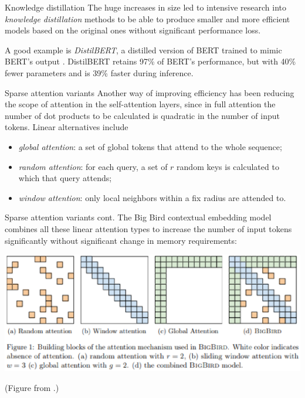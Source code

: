 \documentclass[style=upen, size=14pt]{powerdot}
\newcommand{\gold}{\color{arany}}
\theoremstyle{definition}
\begin{document}
\begin{slide}[toc=Distillation]{Knowledge distillation}
  The huge increases in size led to intensive research into \emph{knowledge
    distillation} methods to be able to produce smaller and more efficient
  models based on the original ones without significant performance
  loss.\bigskip

  A good example is \emph{\gold DistilBERT}, a distilled version of BERT trained
  to mimic BERT's output \citep{sanh2019distilbert}. DistilBERT retains 97\% of
  BERT's performance, but with 40\% fewer parameters and is 39\% faster during
  inference.
\end{slide}

\begin{slide}[toc=Sparse attention]{Sparse attention variants}
  Another way of improving efficiency has been reducing the scope of attention
  in the self-attention layers, since in full attention the number of dot
  products to be calculated is quadratic in the number of input tokens. Linear
  alternatives include
  \begin{itemize}
  \item \emph{\gold global attention}: a set of global tokens that attend to
    the whole sequence;
  \item \emph{\gold random attention}: for each query, a set of $r$ random keys
    is calculated to which that query attends;
  \item \emph{\gold window attention}: only local neighbors within a fix radius
    are attended to.
  \end{itemize}
\end{slide}

\begin{slide}[toc=Sparse attention]{Sparse attention variants cont.}
  The Big Bird contextual embedding model \citep{zaheer2020big} combines all
  these linear attention types to increase the number of input tokens
  significantly without significant change in memory requirements:\medskip

  \begin{centering}
    
    \includegraphics[width=1.\textwidth]{figures/bigbird.eps}

    \footnotesize{(Figure from \cite{zaheer2020big}.)}
    
  \end{centering}
\end{slide}
\end{document}
